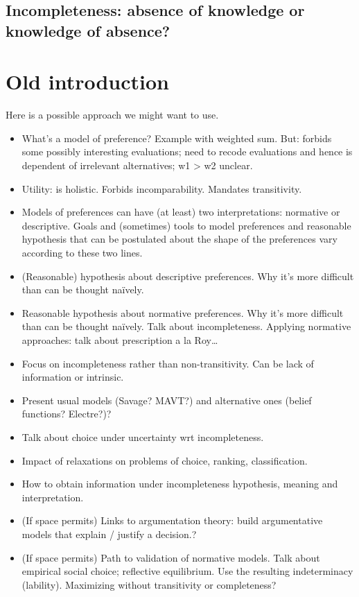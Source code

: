 \documentclass[french, english]{llncs}
\begin{document}
\subsection{Incompleteness: absence of knowledge or knowledge of absence?}

\section{Old introduction}

Here is a possible approach we might want to use.

\begin{itemize}
	\item What’s a model of preference? Example with weighted sum. But: forbids some possibly interesting evaluations; need to recode evaluations and hence is dependent of irrelevant alternatives; w1 > w2 unclear.
	\item Utility: is holistic. Forbids incomparability. Mandates transitivity.
	\item Models of preferences can have (at least) two interpretations: normative or descriptive. Goals and (sometimes) tools to model preferences and reasonable hypothesis that can be postulated about the shape of the preferences vary according to these two lines.
	\item (Reasonable) hypothesis about descriptive preferences. Why it’s more difficult than can be thought naïvely. 
	\item Reasonable hypothesis about normative preferences. Why it’s more difficult than can be thought naïvely. Talk about incompleteness. Applying normative approaches: talk about prescription a la Roy…
	\item Focus on incompleteness rather than non-transitivity. Can be lack of information or intrinsic.
	\item Present usual models (Savage? MAVT?) and alternative ones (belief functions? Electre?)?
	\item Talk about choice under uncertainty wrt incompleteness.
	\item Impact of relaxations on problems of choice, ranking, classification.
	\item How to obtain information under incompleteness hypothesis, meaning and interpretation.
	\item (If space permits) Links to argumentation theory: build argumentative models that explain / justify a decision.?
	\item (If space permits) Path to validation of normative models. Talk about empirical social choice; reflective equilibrium. Use the resulting indeterminacy (lability). Maximizing without transitivity or completeness?
\end{itemize}
\end{document}
